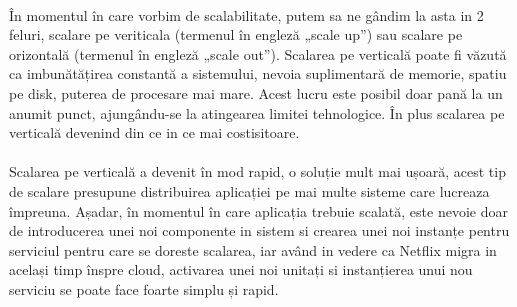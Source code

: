 \documentclass[12pt]{report}
\begin{document}
	\paragraph{}În momentul în care vorbim de scalabilitate, putem sa ne gândim la asta in 2 feluri, scalare pe veriticala (termenul în engleză „scale up”) sau scalare pe orizontală (termenul în engleză „scale out”). Scalarea pe verticală poate fi văzută ca imbunătățirea constantă a sistemului, nevoia suplimentară de memorie, spatiu pe disk, puterea de procesare mai mare. Acest lucru este posibil doar pană la un anumit punct, ajungându-se la atingearea limitei tehnologice. În plus scalarea pe verticală devenind din ce in ce mai costisitoare.
	\paragraph{}Scalarea pe verticală a devenit în mod rapid, o soluție mult mai ușoară, acest tip de scalare presupune distribuirea aplicației pe mai multe sisteme care lucreaza împreuna. Așadar, în momentul în care aplicația trebuie scalată, este nevoie doar de introducerea unei noi componente in sistem si crearea unei noi instanțe pentru serviciul pentru care se doreste scalarea, iar având in vedere ca Netflix migra in același timp înspre cloud, activarea unei noi unitați si instanțierea unui nou serviciu se poate face foarte simplu și rapid.
\end{document}
